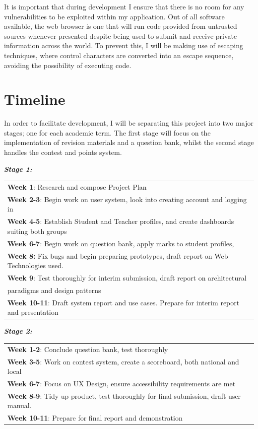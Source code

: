 \documentclass[]{final_report}
\newcommand{\bpoint}{\hspace {-2.75pt}$\bullet$ \hspace{5pt}}
\begin{document}
It is important that during development I ensure that there is no room for any vulnerabilities to be exploited within my application. Out of all software available, the web browser is one that will run code provided from untrusted sources whenever presented\cite{WEB_SEC} despite being used to submit and receive private information across the world. To prevent this, I will be making use of escaping techniques, where control characters are converted into an escape sequence, avoiding the possibility of executing code.


\chapter*{Timeline}

In order to facilitate development, I will be separating this project into two major stages; one for each academic term. The first stage will focus on the implementation of revision materials and a question bank, whilst the second stage handles the contest and points system. 

\textbf{\textit{Stage 1:}}\\
\begin{tabular}{|@{\bpoint} l}
	\textbf{Week 1}: Research and compose Project Plan \\
	\textbf{Week 2-3}: Begin work on user system, look into creating account and logging in \\
	\textbf{Week 4-5}: Establish Student and Teacher profiles, and create dashboards suiting both groups \\ 
	\textbf{Week 6-7}: Begin work on question bank, apply marks to student profiles,\\
	\textbf{Week 8:} Fix bugs and begin preparing prototypes, draft report on Web Technologies used.\\
	\textbf{Week 9}: Test thoroughly for interim submission, draft report on architectural\\ paradigms and design patterns\\
	\textbf{Week 10-11}: Draft system report and use cases. Prepare for interim report and presentation
\end{tabular}

\textbf{\textit{Stage 2:}}\\
\begin{tabular}{|@{\bpoint} l}
	\textbf{Week 1-2}: Conclude question bank, test thoroughly \\
	\textbf{Week 3-5}: Work on contest system, create a scoreboard, both national and local\\
	\textbf{Week 6-7}: Focus on UX Design, ensure accessibility requirements are met \\
	\textbf{Week 8-9}: Tidy up product, test thoroughly for final submission, draft user manual. \\
	\textbf{Week 10-11}: Prepare for final report and demonstration
\end{tabular}
\end{document}
